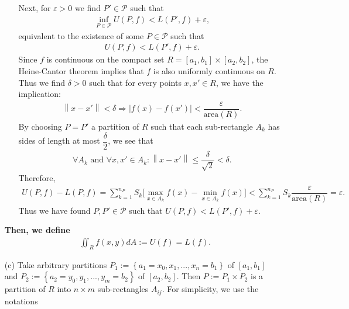 \begin{problem}
\begin{solution}
\begin{enumerate}
\begin{enumerate}
        Next, for $\varepsilon >0$ we find $P'\in\mathcal{P}$ such that 
        \begin{align*}
            \inf\limits_{P\in\mathcal{P}} U(P,f) < L(P',f) + \varepsilon,
        \end{align*}
        equivalent to the existence of some  $P\in\mathcal{P}$ such that 
        \begin{align*}
            U(P,f) < L(P',f) + \varepsilon. 
        \end{align*}
        Since $f$ is continuous on the compact set $R=[a_1,b_1]\times [a_2,b_2]$, the Heine-Cantor theorem implies that $f$ is also uniformly continuous on $R$. Thus we find $\delta >0$ such that for every points $x,x' \in R$, we have the implication:
        \begin{align*}
            \left\| x - x' \right\| < \delta \Longrightarrow \left| f(x) - f(x') \right| < \dfrac{\varepsilon}{\mathrm{area}(R)}.
        \end{align*}
        By choosing $P=P'$ a partition of $R$ such that each sub-rectangle $A_k$ has sides of length at most $\dfrac{\delta}{2}$, we see that
        \begin{align*}
            \forall A_k \text{ and } \forall x,x' \in A_k: \left\| x-x' \right\| \le \dfrac{\delta}{\sqrt{2}} < \delta.
        \end{align*}
        Therefore,
        \begin{align*}
            U(P,f) - L(P,f) = \displaystyle\sum\limits_{k=1}^{n_P} S_k \big[ \max\limits_{x\in A_k} f(x) - \min\limits_{x\in A_k} f(x) \big] < \displaystyle\sum\limits_{k=1}^{n_P} S_k \dfrac{\varepsilon}{\mathrm{area}(R)} = \varepsilon. 
        \end{align*}
        Thus we have found $P,P'\in\mathcal{P}$ such that $U(P,f) < L(P',f) + \varepsilon$. 
    \end{enumerate}
    \textbf{Then, we define} 
    \begin{align*}
    \displaystyle\iint_{R} f(x,y)dA := U(f) = L(f).
    \end{align*}
    \item[(c)] Take arbitrary partitions $P_1 :=\left\{ a_1 = x_0 , x_1 ,... , x_n = b_1 \right\}$ of $[a_1,b_1]$ \\
    and $P_2 := \left\{ a_2 = y_0 , y_1 , ... , y_m = b_2 \right\}$ of $[a_2,b_2]$. Then $P := P_1 \times P_2$ is a partition of $R$ into $n\times m$ sub-rectangles $A_{ij}$. For simplicity, we use the notations
    \begin{align*}

\end{align*}
\end{enumerate}
\end{solution}
\end{problem}
